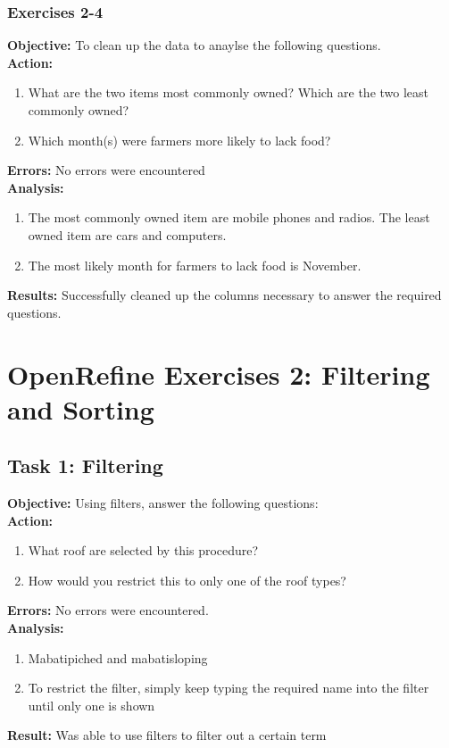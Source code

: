 \documentclass{article}
\begin{document}
\subsubsection{Exercises 2-4}
\textbf{Objective:} To clean up the data to anaylse the following questions.\\
\textbf{Action:}
\begin{enumerate}
    \item What are the two items most commonly owned? Which are the two least commonly owned?
    \item Which month(s) were farmers more likely to lack food?
\end{enumerate}
\textbf{Errors:} No errors were encountered\\
\textbf{Analysis:}
\begin{enumerate}
    \item The most commonly owned item are mobile phones and radios. The least owned item are cars and computers.
    \item The most likely month for farmers to lack food is November.
\end{enumerate}
\textbf{Results:} Successfully cleaned up the columns necessary to answer the required questions.\\
\section{OpenRefine Exercises 2: Filtering and Sorting}
\subsection{Task 1: Filtering}
\textbf{Objective:} Using filters, answer the following questions:\\
\textbf{Action:}
\begin{enumerate}
    \item What roof are selected by this procedure?
    \item How would you restrict this to only one of the roof types?
\end{enumerate}
\textbf{Errors:} No errors were encountered.\\
\textbf{Analysis:}
\begin{enumerate}
    \item Mabatipiched and mabatisloping
    \item To restrict the filter, simply keep typing the required name into the filter until only one is shown
\end{enumerate}
\textbf{Result:} Was able to use filters to filter out a certain term
\end{document}
